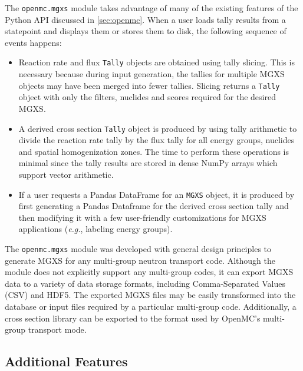 The \texttt{openmc.mgxs} module takes advantage of many of the existing features of the Python API discussed in \cref{sec:openmc}. When a user loads tally results from a statepoint and displays them or stores them to disk, the following sequence of events happens:

\begin{itemize}[noitemsep]
\item Reaction rate and flux \texttt{Tally} objects are obtained using tally slicing. This is necessary because during input generation, the tallies for multiple MGXS objects may have been merged into fewer tallies. Slicing returns a \texttt{Tally} object with only the filters, nuclides and scores required for the desired MGXS.
\item A derived cross section \texttt{Tally} object is produced by using tally arithmetic to divide the reaction rate tally by the flux tally for all energy groups, nuclides and spatial homogenization zones. The time to perform these operations is minimal since the tally results are stored in dense NumPy arrays which support vector arithmetic.
\item If a user requests a Pandas DataFrame for an \texttt{MGXS} object, it is produced by first generating a Pandas Dataframe for the derived cross section tally and then modifying it with a few user-friendly customizations for MGXS applications (\textit{e.g.}, labeling energy groups).
\end{itemize}

The \texttt{openmc.mgxs} module was developed with general design principles to generate MGXS for any multi-group neutron transport code. Although the module does not explicitly support any multi-group codes, it can export MGXS data to a variety of data storage formats, including Comma-Separated Values (CSV) and HDF5. The exported MGXS files may be easily transformed into the database or input files required by a particular multi-group code. Additionally, a cross section library can be exported to the format used by OpenMC's multi-group transport mode.

\subsection{Additional Features}
\label{sec:features}


